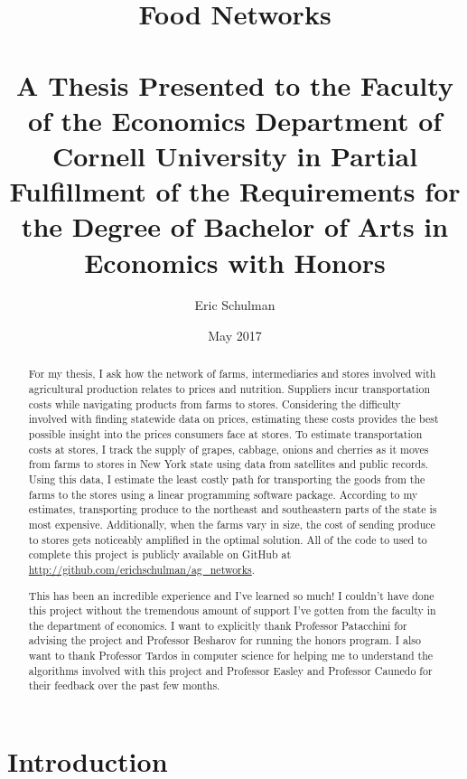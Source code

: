 \documentclass{report}
\title{Food Networks \\~\\ \normalsize A Thesis Presented to the Faculty of the Economics Department of Cornell University in Partial Fulfillment of the Requirements for the Degree of Bachelor of Arts in Economics with Honors}
\author{Eric Schulman}
\date{May 2017}
\begin{document}
\maketitle

\pagebreak

\begin{abstract}
For my thesis, I ask how the network of farms, intermediaries and stores involved with agricultural production relates to prices and nutrition. Suppliers incur transportation costs while navigating products from farms to stores. Considering the difficulty involved with finding statewide data on prices, estimating these costs provides the best possible insight into the prices consumers face at stores. To estimate transportation costs at stores, I track the supply of grapes, cabbage, onions and cherries as it moves from farms to stores in New York state using data from satellites and public records. Using this data, I estimate the least costly path for transporting the goods from the farms to the stores using a linear programming software package. According to my estimates, transporting produce to the northeast and southeastern parts of the state is most expensive. Additionally, when the farms vary in size, the cost of sending produce to stores gets noticeably amplified in the optimal solution. All of the code to used to complete this project is publicly available on GitHub at \url{http://github.com/erichschulman/ag_networks}. 
\end{abstract}

\pagebreak

\renewcommand{\abstractname}{Acknowledgments}
\begin{abstract}
This has been an incredible experience and I've learned so much! I couldn't have done this project without the tremendous amount of support I've gotten from the faculty in the department of economics. I want to explicitly thank Professor Patacchini for advising the project and Professor Besharov for running the honors program. I also want to thank Professor Tardos in computer science for helping me to understand the algorithms involved with this project and Professor Easley and Professor Caunedo for their feedback over the past few months. 
\end{abstract}

\tableofcontents

\chapter{Introduction}
\end{document}
